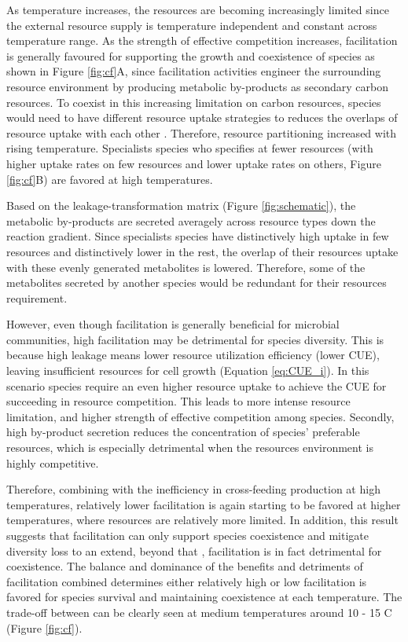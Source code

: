 \documentclass[11pt, a4paper]{article}
\begin{document}
\begin{spacing}{1.5}
As temperature increases, the resources are becoming increasingly limited since the external resource supply is temperature independent and constant across temperature range. As the strength of effective competition increases, facilitation is generally favoured for supporting the growth and coexistence of species \citep{seth2014nutrient, pascual2020metabolically} as shown in Figure \ref{fig:cf}A, since facilitation activities engineer the surrounding resource environment by producing metabolic by-products as secondary carbon resources. To coexist in this increasing limitation on carbon resources, species would need to have different resource uptake strategies to reduces the overlaps of resource uptake with each other \citep{chesson2000mechanisms}. Therefore, resource partitioning increased with rising temperature. Specialists species who specifies at fewer resources (with higher uptake rates on few resources and lower uptake rates on others, Figure \ref{fig:cf}B) are favored at high temperatures. 

Based on the leakage-transformation matrix (Figure \ref{fig:schematic}), the metabolic by-products are secreted averagely across resource types down the reaction gradient. Since specialists species have distinctively high uptake in few resources and distinctively lower in the rest, the overlap of their resources uptake with these evenly generated metabolites is lowered. Therefore, some of the metabolites secreted by another species would be redundant for their resources requirement. 

However, even though facilitation is generally beneficial for microbial communities, high facilitation may be detrimental for species diversity. This is because high leakage means lower resource utilization efficiency (lower CUE), leaving insufficient resources for cell growth (Equation \ref{eq:CUE_i}). In this scenario species require an even higher resource uptake to achieve the CUE for succeeding in resource competition. This leads to more intense resource limitation, and higher strength of effective competition among species. Secondly, high by-product secretion reduces the concentration of species' preferable resources, which is especially detrimental when the resources environment is highly competitive. 

Therefore, combining with the inefficiency in cross-feeding production at high temperatures, relatively lower facilitation is again starting to be favored at higher temperatures, where resources are relatively more limited. In addition, this result suggests that facilitation can only support species coexistence and mitigate diversity loss to an extend, beyond that , facilitation is in fact detrimental for coexistence. The balance and dominance of the benefits and detriments of facilitation combined determines either relatively high or low facilitation is favored for species survival and maintaining coexistence at each temperature. The trade-off between can be clearly seen at medium temperatures around 10 - 15 \textdegree C (Figure \ref{fig:cf}). 


\end{spacing}
\end{document}
